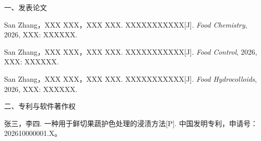 \label{chap:achievements}

\vspace{0.5\baselineskip}

{\songti\fontsize{12bp}{18bp}\selectfont
	
	\begin{QAUitemblock}{一、发表论文}
		\item[1.] San Zhang，XXX XXX，XXX XXX. XXXXXXXXXXX[J]. \textit{Food Chemistry}, 2026, XXX: XXXXXX.
		\item[2.] San Zhang，XXX XXX，XXX XXX. XXXXXXXXXXX[J]. \textit{Food Control}, 2026, XXX: XXXXXX.
		\item[3.] San Zhang，XXX XXX，XXX XXX. XXXXXXXXXXX[J]. \textit{Food Hydrocolloids}, 2026, XXX: XXXXXX.
	\end{QAUitemblock}
	
	\begin{QAUitemblock}{二、专利与软件著作权}
		\item[1.] 张三，李四. 一种用于鲜切果蔬护色处理的浸渍方法[P]. 中国发明专利，申请号：202610000001.X。
	\end{QAUitemblock}
	
}
